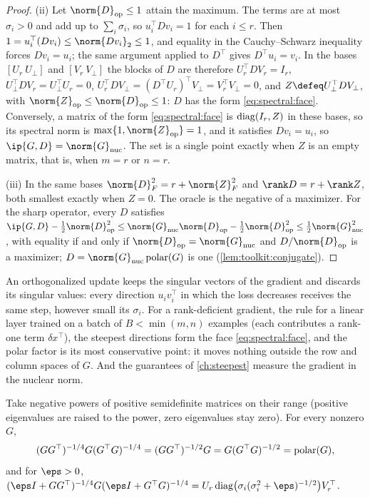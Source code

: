 \begin{refsection}
\begin{proof}
(ii) Let $\norm{D}_{\op}\le1$ attain the maximum. The terms are at most $\sigma_i>0$ and add up to $\sum_i\sigma_i$, so $u_i^\top Dv_i=1$ for each $i\le r$. Then $1=u_i^\top(Dv_i)\le\norm{Dv_i}_2\le1$, and equality in the Cauchy--Schwarz inequality forces $Dv_i=u_i$; the same argument applied to $D^\top$ gives $D^\top u_i=v_i$. In the bases $[U_r\ U_\perp]$ and $[V_r\ V_\perp]$ the blocks of $D$ are therefore $U_r^\top DV_r=I_r$, $U_\perp^\top DV_r=U_\perp^\top U_r=0$, $U_r^\top DV_\perp=(D^\top U_r)^\top V_\perp=V_r^\top V_\perp=0$, and $Z\defeq U_\perp^\top DV_\perp$, with $\norm{Z}_{\op}\le\norm{D}_{\op}\le1$: $D$ has the form \eqref{eq:spectral:face}. Conversely, a matrix of the form \eqref{eq:spectral:face} is $\operatorname{diag}(I_r,Z)$ in these bases, so its spectral norm is $\max\{1,\norm{Z}_{\op}\}=1$, and it satisfies $Dv_i=u_i$, so $\ip{G,D}=\norm{G}_{\nuc}$. The set is a single point exactly when $Z$ is an empty matrix, that is, when $m=r$ or $n=r$.

(iii) In the same bases $\norm{D}_F^2=r+\norm{Z}_F^2$ and $\rank D=r+\rank Z$, both smallest exactly when $Z=0$. The oracle is the negative of a maximizer. For the sharp operator, every $D$ satisfies $\ip{G,D}-\frac12\norm{D}_{\op}^2\le\norm{G}_{\nuc}\norm{D}_{\op}-\frac12\norm{D}_{\op}^2\le\frac12\norm{G}_{\nuc}^2$, with equality if and only if $\norm{D}_{\op}=\norm{G}_{\nuc}$ and $D/\norm{D}_{\op}$ is a maximizer; $D=\norm{G}_{\nuc}\polar(G)$ is one (\cref{lem:toolkit:conjugate}).
\end{proof}

An orthogonalized update keeps the singular vectors of the gradient and discards its singular values: every direction $u_iv_i^\top$ in which the loss decreases receives the same step, however small its $\sigma_i$. For a rank-deficient gradient, the rule for a linear layer trained on a batch of $B<\min(m,n)$ examples (each contributes a rank-one term $\delta x^\top$), the steepest directions form the face \eqref{eq:spectral:face}, and the polar factor is its most conservative point: it moves nothing outside the row and column spaces of $G$. And the guarantees of \cref{ch:steepest} measure the gradient in the nuclear norm.

\begin{proposition}\label{prop:spectral:shampoo}
Take negative powers of positive semidefinite matrices on their range (positive eigenvalues are raised to the power, zero eigenvalues stay zero). For every nonzero $G$,
\[
  (GG^\top)^{-1/4}G(G^\top G)^{-1/4}=(GG^\top)^{-1/2}G=G(G^\top G)^{-1/2}=\operatorname{polar}(G),
\]
and for $\eps>0$, $(\eps I+GG^\top)^{-1/4}G(\eps I+G^\top G)^{-1/4}=U_r\diag\bigl(\sigma_i(\sigma_i^2+\eps)^{-1/2}\bigr)V_r^\top$.
\end{proposition}


\end{refsection}
